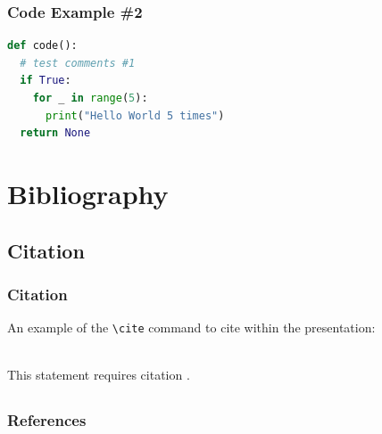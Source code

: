 \documentclass{presentation-beamer}
\begin{document}
\begin{frame}[fragile]
\frametitle{Code Example \#2}


\begin{lstlisting}[language=Python]
def code():
  # test comments #1    
  if True:
    for _ in range(5):
      print("Hello World 5 times")
  return None     
\end{lstlisting}

\end{frame}

\section{Bibliography}
\subsection{Citation}
\begin{frame}[fragile] %
\frametitle{Citation}
An example of the \verb|\cite| command to cite within the presentation:\\~

This statement requires citation \cite{ah2006}.~\cite{aetal2018} 
\end{frame}

\subsection{}
\begin{frame}[t, allowframebreaks]
\frametitle{References}

\end{frame}
\end{document}
